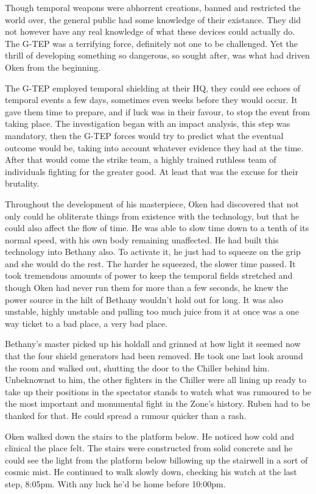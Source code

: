 Though temporal weapons were abhorrent creations, banned and restricted the world over, the general public had some knowledge of their existance. They did not however have any real knowledge of what these devices could actually do. The G-TEP was a terrifying force, definitely not one to be challenged. Yet the thrill of developing something so dangerous, so sought after, was what had driven Oken from the beginning.

The G-TEP employed temporal shielding at their HQ, they could see echoes of temporal events a few days, sometimes even weeks before they would occur. It gave them time to prepare, and if luck was in their favour, to stop the event from taking place. The investigation began with an impact analysis, this step was mandatory, then the G-TEP forces would try to predict what the eventual outcome would be, taking into account whatever evidence they had at the time. After that would come the strike team, a highly trained ruthless team of individuals fighting for the greater good. At least that was the excuse for their brutality.

Throughout the development of his masterpiece, Oken had discovered that not only could he obliterate things from existence with the technology, but that he could also affect the flow of time. He was able to slow time down to a tenth of its normal speed, with his own body remaining unaffected. He had built this technology into Bethany also. To activate it, he just had to squeeze on the grip and she would do the rest. The harder he squeezed, the slower time passed. It took tremendous amounts of power to keep the temporal fields stretched and though Oken had never run them for more than a few seconds, he knew the power source in the hilt of Bethany wouldn't hold out for long. It was also unstable, highly unstable and pulling too much juice from it at once was a one way ticket to a bad place, a very bad place.

Bethany's master picked up his holdall and grinned at how light it seemed now that the four shield generators had been removed. He took one last look around the room and walked out, shutting the door to the Chiller behind him. Unbeknownst to him, the other fighters in the Chiller were all lining up ready to take up their positions in the spectator stands to watch what was rumoured to be the most important and monumental fight in the Zone's history. Ruben had to be thanked for that. He could spread a rumour quicker than a rash.

Oken walked down the stairs to the platform below. He noticed how cold and clinical the place felt. The stairs were constructed from solid concrete and he could see the light from the platform below billowing up the stairwell in a sort of cosmic mist. He continued to walk slowly down, checking his watch at the last step, 8:05pm. With any luck he'd be home before 10:00pm.


